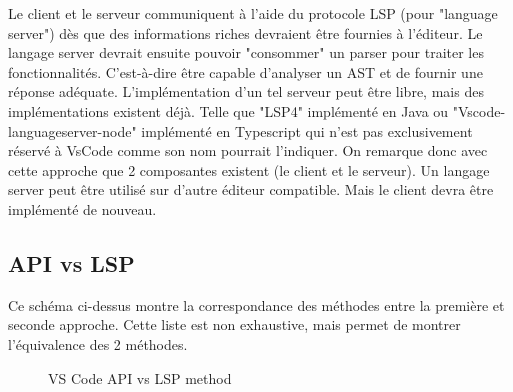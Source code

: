 \documentclass[
    iict, %
    il, %
]{heig-tb}
\begin{document}
\vspace{\parskip}

Le client et le serveur communiquent à l'aide du protocole LSP (pour "language server") dès que des informations riches devraient être fournies à l'éditeur.
Le langage server devrait ensuite pouvoir "consommer" un parser pour traiter les fonctionnalités. C'est-à-dire être capable d'analyser un AST et de fournir une réponse adéquate.
L'implémentation d'un tel serveur peut être libre, mais des implémentations existent déjà. Telle que "LSP4" implémenté en Java ou  "Vscode-languageserver-node" implémenté en Typescript qui n'est pas exclusivement réservé à VsCode comme son nom pourrait l'indiquer.
On remarque donc avec cette approche que 2 composantes existent (le client et le serveur).
Un langage server peut être utilisé sur d'autre éditeur compatible. Mais le client devra être implémenté de nouveau.

\subsection{API vs LSP}\label{api vs lsp}

Ce schéma ci-dessus montre la correspondance des méthodes entre la première et seconde approche.
Cette liste est non exhaustive, mais permet de montrer l'équivalence des 2 méthodes.

\begin{figure}[!h]
    \begin{center}
    \end{center}
    \caption[API vs LSP]{\label{api vs lsp} VS Code API vs LSP method}
\end{figure}
\end{document}
